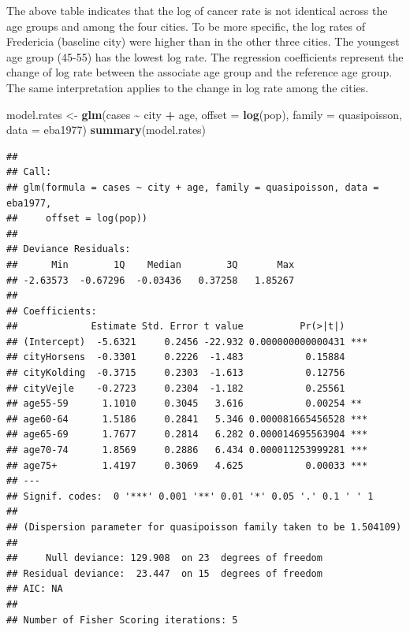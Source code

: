 \documentclass[
]{book}
\newenvironment{Shaded}{\begin{snugshade}}{\end{snugshade}}
\newcommand{\AttributeTok}[1]{\textcolor[rgb]{0.13,0.29,0.53}{#1}}
\newcommand{\FunctionTok}[1]{\textcolor[rgb]{0.13,0.29,0.53}{\textbf{#1}}}
\newcommand{\NormalTok}[1]{#1}
\newcommand{\OtherTok}[1]{\textcolor[rgb]{0.56,0.35,0.01}{#1}}
\newcommand{\SpecialCharTok}[1]{\textcolor[rgb]{0.81,0.36,0.00}{\textbf{#1}}}
\newcommand{\StringTok}[1]{\textcolor[rgb]{0.31,0.60,0.02}{#1}}
\begin{document}
The above table indicates that the log of cancer rate is not identical across the age groups and among the four cities. To be more specific, the log rates of Fredericia (baseline city) were higher than in the other three cities. The youngest age group (45-55) has the lowest log rate. The regression coefficients represent the change of log rate between the associate age group and the reference age group. The same interpretation applies to the change in log rate among the cities.

\begin{Shaded}
\begin{Highlighting}[]
\NormalTok{model.rates }\OtherTok{\textless{}{-}} \FunctionTok{glm}\NormalTok{(cases }\SpecialCharTok{\textasciitilde{}}\NormalTok{ city }\SpecialCharTok{+}\NormalTok{ age, }\AttributeTok{offset =} \FunctionTok{log}\NormalTok{(pop), }
                   \AttributeTok{family =}\NormalTok{ quasipoisson, }\AttributeTok{data =}\NormalTok{ eba1977)}
\FunctionTok{summary}\NormalTok{(model.rates)}
\end{Highlighting}
\end{Shaded}

\begin{verbatim}
## 
## Call:
## glm(formula = cases ~ city + age, family = quasipoisson, data = eba1977, 
##     offset = log(pop))
## 
## Deviance Residuals: 
##      Min        1Q    Median        3Q       Max  
## -2.63573  -0.67296  -0.03436   0.37258   1.85267  
## 
## Coefficients:
##             Estimate Std. Error t value          Pr(>|t|)    
## (Intercept)  -5.6321     0.2456 -22.932 0.000000000000431 ***
## cityHorsens  -0.3301     0.2226  -1.483           0.15884    
## cityKolding  -0.3715     0.2303  -1.613           0.12756    
## cityVejle    -0.2723     0.2304  -1.182           0.25561    
## age55-59      1.1010     0.3045   3.616           0.00254 ** 
## age60-64      1.5186     0.2841   5.346 0.000081665456528 ***
## age65-69      1.7677     0.2814   6.282 0.000014695563904 ***
## age70-74      1.8569     0.2886   6.434 0.000011253999281 ***
## age75+        1.4197     0.3069   4.625           0.00033 ***
## ---
## Signif. codes:  0 '***' 0.001 '**' 0.01 '*' 0.05 '.' 0.1 ' ' 1
## 
## (Dispersion parameter for quasipoisson family taken to be 1.504109)
## 
##     Null deviance: 129.908  on 23  degrees of freedom
## Residual deviance:  23.447  on 15  degrees of freedom
## AIC: NA
## 
## Number of Fisher Scoring iterations: 5
\end{verbatim}

\begin{Shaded}
\end{Shaded}
\end{document}
